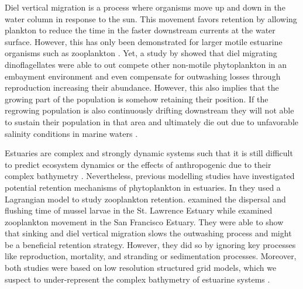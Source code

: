 \documentclass[npg, manuscript]{copernicus}
\begin{document}
Diel vertical migration is a process where organisms move up and down in the water column in response to the sun.
This movement favors retention by allowing plankton to reduce the time in the faster downstream currents at the water surface.
However, this has only been demonstrated for larger motile estuarine organisms such as zooplankton \citep{Hall2015, Kimmerer2002, Crawford1991,Hall2011}.
Yet, a study by \citep{Anderson1985} showed that diel migrating dinoflagellates were able to out compete other non-motile phytoplankton in an embayment environment and even compensate for outwashing losses through reproduction increasing their abundance.
However, this also implies that the growing part of the population is somehow retaining their position.
If the regrowing population is also continuously drifting downstream they will not able to sustain their population in that area and ultimately die out due to unfavorable salinity conditions in marine waters \citep{Admiraal1976, vonAlvensleben2016, Jiang2020}.

Estuaries are complex and strongly dynamic systems such that it is still difficult to predict ecosystem dynamics or the effects of anthropogenic due to their complex bathymetry \citep{Michael2016, Fringer2019}. 
Nevertheless, previous modelling studies have investigated potential retention mechanisms of phytoplankton in estuaries.
In \citep{Simons2006,Kimmerer2014} they used a Lagrangian model to study zooplankton retention.
\citep{Simons2006} examined the dispersal and flushing time of mussel larvae in the St. Lawrence Estuary while \citep{Kimmerer2014} examined zooplankton movement in the San Francisco Estuary.
They were able to show that sinking and diel vertical migration slows the outwashing process and might be a beneficial retention strategy.
However, they did so by ignoring key processes like reproduction, mortality, and stranding or sedimentation processes.
Moreover, both studies were based on low resolution structured grid models, which we suspect to under-represent the complex bathymetry of estuarine systems \citep{Ye2018}.
\end{document}
